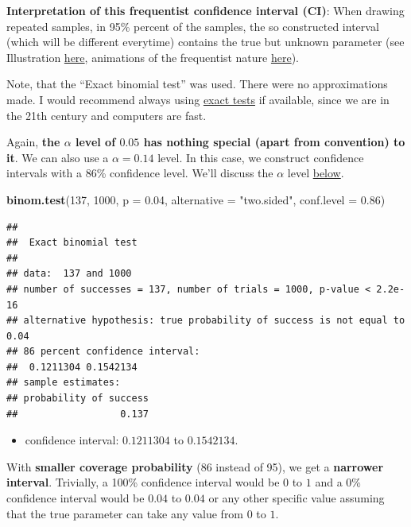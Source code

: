 \documentclass[
]{book}
\newenvironment{Shaded}{\begin{snugshade}}{\end{snugshade}}
\newcommand{\AttributeTok}[1]{\textcolor[rgb]{0.13,0.29,0.53}{#1}}
\newcommand{\DecValTok}[1]{\textcolor[rgb]{0.00,0.00,0.81}{#1}}
\newcommand{\FloatTok}[1]{\textcolor[rgb]{0.00,0.00,0.81}{#1}}
\newcommand{\FunctionTok}[1]{\textcolor[rgb]{0.13,0.29,0.53}{\textbf{#1}}}
\newcommand{\NormalTok}[1]{#1}
\newcommand{\StringTok}[1]{\textcolor[rgb]{0.31,0.60,0.02}{#1}}
\providecommand{\tightlist}{%
  \setlength{\itemsep}{0pt}\setlength{\parskip}{0pt}}
\begin{document}
\textbf{Interpretation of this frequentist confidence interval (CI)}: When drawing repeated samples, in 95\% percent of the samples,
the so constructed interval (which will be different everytime) contains the true but unknown
parameter (see Illustration \href{https://en.wikipedia.org/wiki/Confidence_interval\#/media/File:Normal_distribution_50\%25_CI_illustration.svg}{here},
animations of the frequentist nature \href{https://seeing-theory.brown.edu/frequentist-inference/index.html}{here}).

Note, that the ``Exact binomial test'' was used. There were no approximations made. I would recommend always
using \href{https://en.wikipedia.org/wiki/Exact_test}{exact tests} if available, since we are in the 21th century and computers are fast.

Again, \textbf{the \(\alpha\) level of \(0.05\) has nothing special (apart from convention) to it}.
We can also use a \(\alpha = 0.14\) level. In this case, we construct confidence intervals
with a 86\% confidence level. We'll discuss the \(\alpha\) level \hyperref[error_types]{below}.

\begin{Shaded}
\begin{Highlighting}[]
\FunctionTok{binom.test}\NormalTok{(}\DecValTok{137}\NormalTok{, }\DecValTok{1000}\NormalTok{, }\AttributeTok{p =} \FloatTok{0.04}\NormalTok{, }\AttributeTok{alternative =} \StringTok{"two.sided"}\NormalTok{, }\AttributeTok{conf.level =} \FloatTok{0.86}\NormalTok{)}
\end{Highlighting}
\end{Shaded}

\begin{verbatim}
## 
##  Exact binomial test
## 
## data:  137 and 1000
## number of successes = 137, number of trials = 1000, p-value < 2.2e-16
## alternative hypothesis: true probability of success is not equal to 0.04
## 86 percent confidence interval:
##  0.1211304 0.1542134
## sample estimates:
## probability of success 
##                  0.137
\end{verbatim}

\begin{itemize}
\tightlist
\item
  confidence interval: \(0.1211304\) to \(0.1542134\).
\end{itemize}

With \textbf{smaller coverage probability} (86 instead of 95), we get a \textbf{narrower interval}.
Trivially, a 100\% confidence interval would be \(0\) to \(1\) and a 0\% confidence interval would be \(0.04\) to \(0.04\) or any other
specific value assuming that the true parameter can take any value from \(0\) to \(1\).
\end{document}
